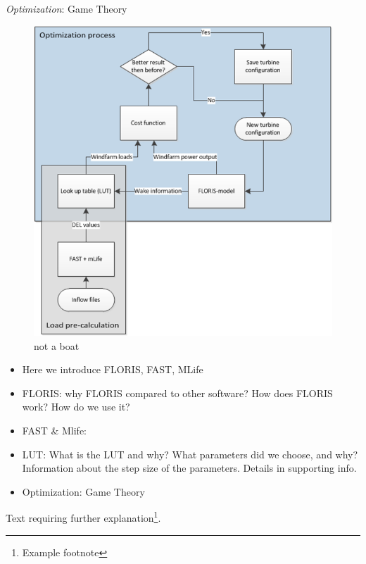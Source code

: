 \textit{Optimization}: Game Theory
\begin{figure}
  \includegraphics[width=\linewidth]{./Figures/OptimizationProcess.png}
  \caption{not a boat}
  \label{fig:optim}
\end{figure}

\begin{itemize}
	\item Here we introduce FLORIS, FAST, MLife
	\item FLORIS: why FLORIS compared to other software? How does FLORIS work? How do we use it?
	\item FAST \& Mlife:
	\item LUT: What is the LUT and why? What parameters did we choose, and why? Information about the step size of the parameters. Details in supporting info.
	\item Optimization: Game Theory
\end{itemize}

Text requiring further explanation\footnote{Example footnote}.